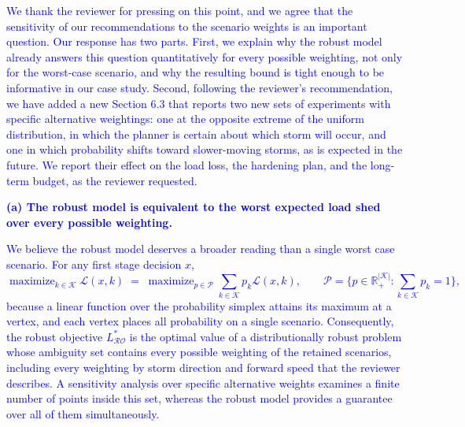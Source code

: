 \documentclass[authoryear,preprint,review,12pt]{elsarticle}\usepackage{amssymb}
\DeclareMathOperator*{\maximize}{maximize}
\begin{document}
\textcolor{blue}{We thank the reviewer for pressing on this point, and we agree that the sensitivity of our recommendations to the scenario weights is an important question. Our response has two parts. First, we explain why the robust model already answers this question quantitatively for every possible weighting, not only for the worst-case scenario, and why the resulting bound is tight enough to be informative in our case study. Second, following the reviewer's recommendation, we have added a new Section 6.3 that reports two new sets of experiments with specific alternative weightings: one at the opposite extreme of the uniform distribution, in which the planner is certain about which storm will occur, and one in which probability shifts toward slower-moving storms, as is expected in the future. We report their effect on the load loss, the hardening plan, and the long-term budget, as the reviewer requested.}

\medskip
\textcolor{blue}{\textbf{(a) The robust model is equivalent to the worst expected load shed over every possible weighting.}}

\textcolor{blue}{We believe the robust model deserves a broader reading than a single worst case scenario. For any first stage decision $x$,
\begin{equation*}
\maximize_{k \in \mathcal{K}} \mathcal{L}(x,k) \;=\; \maximize_{p \in \mathcal{P}} \sum_{k \in \mathcal{K}} p_k \mathcal{L}(x,k), \qquad \mathcal{P} = \Big\{ p \in \mathbb{R}^{|\mathcal{K}|}_{+} : \sum_{k \in \mathcal{K}} p_k = 1 \Big\},
\end{equation*}
because a linear function over the probability simplex attains its maximum at a vertex, and each vertex places all probability on a single scenario. Consequently, the robust objective $L^*_{\mathcal{RO}}$ is the optimal value of a distributionally robust problem whose ambiguity set contains every possible weighting of the retained scenarios, including every weighting by storm direction and forward speed that the reviewer describes. A sensitivity analysis over specific alternative weights examines a finite number of points inside this set, whereas the robust model provides a guarantee over all of them simultaneously.}
\end{document}
